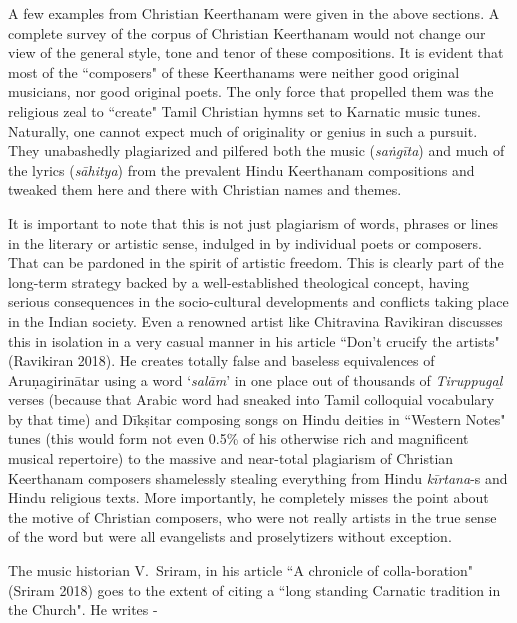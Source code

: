 A few examples from Christian Keerthanam were given in the above sections. A complete survey of the corpus of Christian Keerthanam would not change our view of the general style, tone and tenor of these compositions. It is evident that most of the ``composers" of these Keerthanams were neither good original musicians, nor good original poets. The only force that propelled them was the religious zeal to ``create" Tamil Christian hymns set to Karnatic music tunes. Naturally, one cannot expect much of originality or genius in such a pursuit. They unabashedly plagiarized and pilfered both the music (\textit{saṅgīta}) and much of the lyrics (\textit{sāhitya}) from the prevalent Hindu Keerthanam compositions and tweaked them here and there with Christian names and themes.

It is important to note that this is not just plagiarism of words, phrases or lines in the literary or artistic sense, indulged in by individual poets or composers. That can be pardoned in the spirit of artistic freedom. This is clearly part of the long-term strategy backed by a well-established theological concept, having serious consequences in the socio-cultural developments and conflicts taking place in the Indian society. Even a renowned artist like Chitravina Ravikiran discusses this in isolation in a very casual manner in his article ``Don't crucify the artists" (Ravikiran 2018). He creates totally false and baseless equivalences of Aruṇagirinātar using a word `\textit{salām}' in one place out of thousands of \textit{Tiruppugaḻ} verses (because that Arabic word had sneaked into Tamil colloquial vocabulary by that time) and Dīkṣitar composing songs on Hindu deities in ``Western Notes" tunes (this would form not even 0.5\% of his otherwise rich and magnificent musical repertoire) to the massive and near-total plagiarism of Christian Keerthanam composers shamelessly stealing everything from Hindu \textit{kīrtana}-s and Hindu religious texts. More importantly, he completely misses the point about the motive of Christian composers, who were not really artists in the true sense of the word but were all evangelists and proselytizers without exception.

The music historian V.~Sriram, in his article ``A chronicle of colla\break-boration" (Sriram 2018) goes to the extent of citing a ``long standing Carnatic tradition in the Church". He writes -


